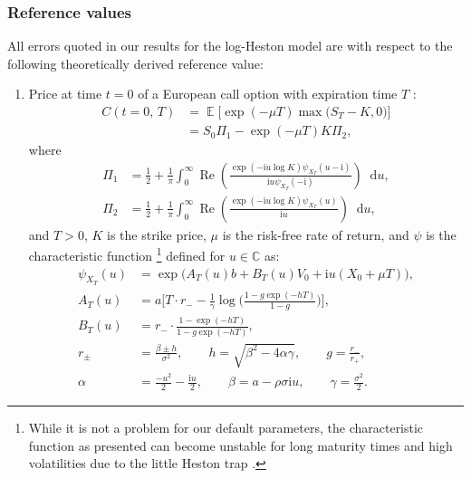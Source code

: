 \documentclass[11pt, letterpaper]{article}
\theoremstyle{definition}
\theoremstyle{remark}
\DeclareMathOperator{\E}{\mathbb{E}}
\newcommand{\iu}{\mathrm{i}}
\newcommand{\diff}{\mathop{}\!\mathrm{d}}
\begin{document}
\begin{appendices}
\subsubsection*{Reference values}
All errors quoted in our results for the log-Heston model are with respect to the following theoretically derived reference value:

\begin{enumerate}
    \item Price at time $t=0$ of a European call option with expiration time $T$ \cite{heston1993, crisostomo2015heston}:
    \begin{equation}
    \begin{aligned}
        C(t=0,\, T) &= \E\bigl[\exp(-\mu T) \max\bigl(S_T - K, 0\bigr)\bigr]\\[2pt]
                    &= S_{0} \Pi_1 - \exp(-\mu T) K \Pi_2,
    \end{aligned}
    \end{equation}
    where
    \begin{align*}
        \Pi_1 &= \frac{1}{2} + \frac{1}{\pi} \int_0^\infty \operatorname{Re}\left(\frac{\exp(-\iu u \log K) \psi_{X_T}(u - \iu)}{\iu u \psi_{X_T}(-\iu)}\right) \diff u,\\
        \Pi_2 &= \frac{1}{2} + \frac{1}{\pi} \int_0^\infty \operatorname{Re}\left(\frac{\exp(-\iu u \log K) \psi_{X_T}(u)}{\iu u}\right) \diff u,
    \end{align*}
    and $T > 0$, $K$ is the strike price, $\mu$ is the risk-free rate of return, and $\psi$ is the characteristic function \footnote{While it is not a problem for our default parameters, the characteristic function as presented can become unstable for long maturity times and high volatilities due to the little Heston trap \cite{albrecher2007little}.}  defined for $u \in \mathbb{C}$ as:
    \begin{align*}
        \psi_{X_T}(u) &= \exp\bigl(A_T(u) b + B_T(u) V_0 + \iu u (X_0 + \mu T)\bigr),  \\[3pt]
        A_T(u) &= a \biggl[ T\cdot r_{-} - \frac{1}{\gamma} \log\biggl(\frac{1 - g\exp(-hT)}{1 - g}\biggr)\biggr],\\
        B_T(u) &= r_{-}\cdot\frac{1 - \exp(-hT)}{1 - g \exp(-hT)},\\[6pt]
        r_{\pm} &= \frac{\beta \pm h}{\sigma^2}, \qquad h = \sqrt{\beta^2 - 4 \alpha \gamma},\qquad g = \frac{r_{-}}{r_{+}},\\
        \alpha &= \frac{-u^2}{2} - \frac{\iu u}{2},\qquad \beta = a - \rho \sigma \iu u, \qquad\gamma = \frac{\sigma^2}{2}.
    \end{align*}
\end{enumerate}


\end{appendices}
\end{document}
